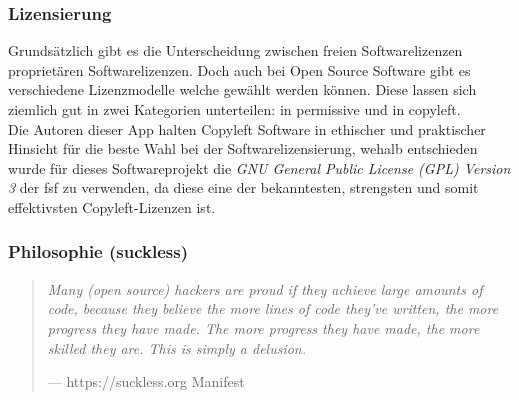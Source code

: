 \documentclass[a4paper,11pt]{article}
\newenvironment{nicequote}[2]{
    \begin{center}\begin{quote}\textit{#1}\\\par\raggedleft--- {#2}
    }{
    \end{quote}\end{center}
}
\begin{document}

\subsubsection{Lizensierung}
Grundsätzlich gibt es die  Unterscheidung zwischen freien Softwarelizenzen proprietären Softwarelizenzen. Doch auch bei Open Source Software gibt es verschiedene Lizenzmodelle welche gewählt werden können. Diese lassen sich ziemlich gut in zwei Kategorien unterteilen: in \gls{permissive} und in \gls{copyleft}.\\

Die Autoren dieser App halten Copyleft Software in ethischer und praktischer Hinsicht für die beste Wahl bei der Softwarelizensierung, wehalb entschieden wurde für dieses Softwareprojekt die \textit{GNU General Public License (GPL) Version 3} \cite{GPLv3} der \gls{fsf} zu verwenden, da diese eine der bekanntesten, strengsten und somit effektivsten Copyleft-Lizenzen ist.


\subsubsection{Philosophie (suckless)}

\begin{nicequote}{Many (open source) hackers are proud if they achieve large amounts of code, because they believe the more lines of code they've written, the more progress they have made. The more progress they have made, the more skilled they are. This is simply a delusion.}{https://suckless.org Manifest \cite{suckless}}
\end{nicequote}

\end{document}
